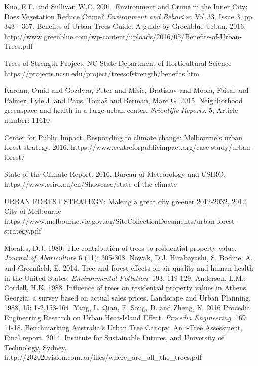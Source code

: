 \begin{bibliography}{}

Kuo, E.F. and Sullivan W.C. 2001. Environment and Crime in the Inner City: Does Vegetation Reduce Crime? \textit{Environment and Behavior}. Vol 33, Issue 3, pp. 343 - 367.
Benefits of Urban Trees Guide. A guide by Greenblue Urban. 2016. http://www.greenblue.com/wp-content/uploads/2016/05/Benefits-of-Urban-Trees.pdf 

Trees of Strength Project, NC State Department of Horticultural Science https://projects.ncsu.edu/project/treesofstrength/benefits.htm

Kardan, Omid and Gozdyra, Peter and Misic, Bratislav and Moola, Faisal and Palmer, Lyle J. and Paus, Tomáš and Berman, Marc G. 2015. Neighborhood greenspace and health in a large urban center. \textit{Scientific Reports}. 5, Article number: 11610 

Center for Public Impact. Responding to climate change: Melbourne’s urban forest strategy. 2016.
 https://www.centreforpublicimpact.org/case-study/urban-forest/ 

State of the Climate Report. 2016. Bureau of Meteorology and CSIRO. https://www.csiro.au/en/Showcase/state-of-the-climate 


URBAN FOREST STRATEGY: Making a great city greener 2012-2032, 2012, City of Melbourne
https://www.melbourne.vic.gov.au/SiteCollectionDocuments/urban-forest-strategy.pdf 

Morales, D.J. 1980. The contribution of trees to residential property value. \textit{Journal of Aboriculture} 6 (11): 305-308.
Nowak, D.J. Hirabayashi, S. Bodine, A. and Greenfield, E. 2014. Tree and forest effects on air quality and human health in the United States. \textit{Environmental Pollution}. 193. 119-129.
Anderson, L.M.; Cordell, H.K. 1988. Influence of trees on residential property values in Athens, Georgia: a survey based on actual sales prices. Landscape and Urban Planning. 1988, 15: 1-2,153-164.
Yang, L. Qian, F. Song, D. and Zheng, K. 2016 Procedia Engineering Research on Urban Heat-Island Effect. \textit{Procedia Engineering}. 169. 11-18. 
Benchmarking Australia’s Urban Tree Canopy: An i-Tree Assessment, Final report. 2014. Institute for Sustainable Futures, and University of Technology, Sydney.   http://202020vision.com.au/files/where_are_all_the_trees.pdf 


\end{bibliography}
